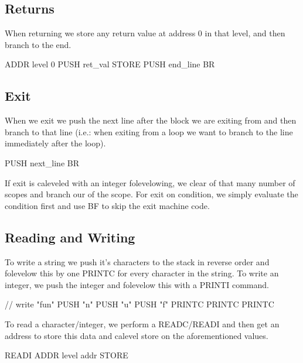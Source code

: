 \subsection{Returns}

When returning we store any return value at address 0 in that level, and then
branch to the end.

\begin{code}[IfStatement]
ADDR level 0
PUSH ret_val
STORE
PUSH end_line
BR
\end{code}

\subsection{Exit}

When we exit we push the next line after the block we are exiting from and then
branch to that line (i.e.: when exiting from a loop we want to branch to the line
immediately after the loop).

\begin{code}[Exit]
PUSH next_line
BR
\end{code}

If exit is caleveled with an integer folevelowing, we clear of that many number of
scopes and branch our of the scope. For exit on condition, we simply evaluate the
condition first and use BF to skip the exit machine code.

\subsection{Reading and Writing}

To write a string we push it's characters to the stack in reverse order and folevelow
this by one PRINTC for every character in the string. To write an integer, we push
the integer and folevelow this with a PRINTI command.

\begin{code}[Writing]
// write "fun"
PUSH "n"
PUSH "u"
PUSH "f"
PRINTC
PRINTC
PRINTC
\end{code}

To read a character/integer, we perform a READC/READI and then get an address to 
store this data and calevel store on the aforementioned values.

\begin{code}[Writing]
READI
ADDR level addr
STORE
\end{code}
